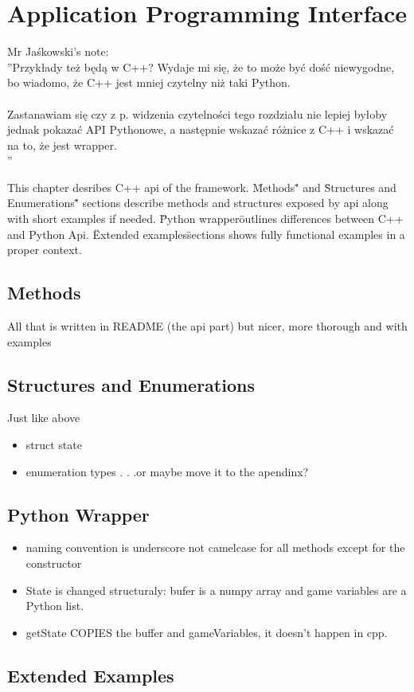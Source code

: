 
\chapter{Application Programming Interface}

Mr Jaśkowski's note:\\
''Przykłady też będą w C++? Wydaje mi się, że to może być dość niewygodne, bo wiadomo, że C++ jest mniej czytelny niż taki Python.\\
\\
Zastanawiam się czy z p. widzenia czytelności tego rozdziału nie lepiej byłoby jednak pokazać API Pythonowe, a następnie wskazać różnice z C++ i wskazać na to, że jest wrapper.\\''

This chapter desribes C++ api of the framework. \"Methods\"" and \"Structures and Enumerations\"" sections describe methods and structures exposed by api along with short examples if needed. \"Python wrapper\" outlines differences between C++ and Python Api. \"Extended examples\" sections shows fully functional examples in a proper context.

\section{Methods}
All that is written in README (the api part) but nicer, more thorough and with examples
\section{Structures and Enumerations}
Just like above
\begin{itemize}
\item struct state
\item enumeration types . . .or maybe move it to the apendinx?
\end{itemize}

\section{Python Wrapper}

\begin{itemize}
\item naming convention is underscore not camelcase for all methods except for the constructor
\item State is changed structuraly: bufer is a numpy array and game variables are a Python list.
\item getState COPIES the buffer and gameVariables, it doesn't happen in cpp. 
\end{itemize}

\section{Extended Examples}
